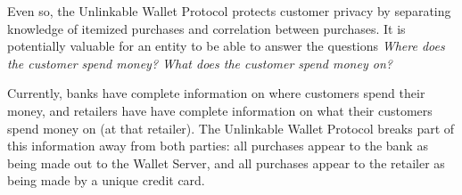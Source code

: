 Even so, the Unlinkable Wallet Protocol protects customer privacy
    by separating knowledge of itemized purchases and correlation between purchases.
It is potentially valuable for an entity to be able to answer the questions \emph{Where does the customer spend money? What does the customer spend money on?}

Currently, banks have complete information on where customers spend their money,
    and retailers have have complete information on what their customers spend money on (at that retailer).
The Unlinkable Wallet Protocol breaks part of this information away from both parties:
    all purchases appear to the bank as being made out to the Wallet Server, and
    all purchases appear to the retailer as being made by a unique credit card.
